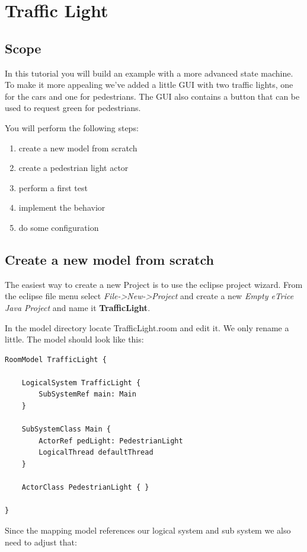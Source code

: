 \section{Traffic Light}

\subsection{Scope}

In this tutorial you will build an example with a more advanced state machine.
To make it more appealing we've added a little GUI with two traffic lights, one for the cars and one for pedestrians.
The GUI also contains a button that can be used to request green for pedestrians.

You will perform the following steps:

\begin{enumerate}
\item create a new model from scratch
\item create a pedestrian light actor
\item perform a first test
\item implement the behavior
\item do some configuration
\end{enumerate}

\subsection{Create a new model from scratch}

The easiest way to create a new \eTrice{} Project is to use the eclipse project wizard. From the eclipse file 
menu select \emph{File->New->Project} and create a new \emph{Empty eTrice Java Project} and name it \textbf{TrafficLight}.

In the model directory locate TrafficLight.room and edit it. We only rename a little.
The model should look like this:

\begin{lstlisting}[language=ROOM]
RoomModel TrafficLight {

	LogicalSystem TrafficLight {
		SubSystemRef main: Main
	}

	SubSystemClass Main {
		ActorRef pedLight: PedestrianLight
		LogicalThread defaultThread
	}

	ActorClass PedestrianLight { }

}
\end{lstlisting}

Since the mapping model references our logical system and sub system we also need to adjust that:

